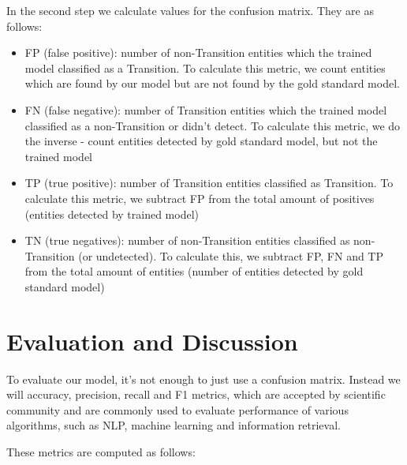 In the second step we calculate values for the confusion matrix. They are as follows:

\begin{itemize}
    \item FP (false positive): number of non-Transition entities which the trained model classified as a Transition. To calculate this metric, we count entities which are found by our model but are not found by the gold standard model.
    \item FN (false negative): number of Transition entities which the trained model classified as a non-Transition or didn’t detect. To calculate this metric, we do the inverse - count entities detected by gold standard model, but not the trained model
    \item TP (true positive): number of Transition entities classified as Transition. To calculate this metric, we subtract FP from the total amount of positives (entities detected by trained model)
    \item TN (true negatives): number of non-Transition entities classified as non-Transition (or undetected). To calculate this, we subtract FP, FN and TP from the total amount of entities (number of entities detected by gold standard model)
\end{itemize}

\section{Evaluation and Discussion}

To evaluate our model, it's not enough to just use a confusion matrix. Instead we will accuracy, precision, recall and F1 metrics, which are accepted by scientific community and are commonly used to evaluate performance of various algorithms, such as NLP, machine learning and information retrieval. 

These metrics are computed as follows:

